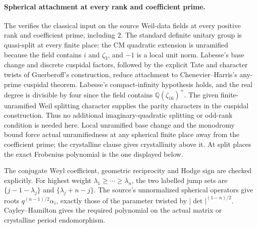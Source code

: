 \paragraph{Spherical attachment at every rank and coefficient prime.}
The  verifies the classical input on the source Weil-data fields
at every positive rank and coefficient prime, including \(2\). The standard
definite unitary group is quasi-split
at every finite place: the CM quadratic extension is unramified
because the field contains \(i\) and \(\zeta_3\), and \(-1\) is
a local unit norm. Labesse's base change and discrete cuspidal
factors, followed by the explicit Tate and character twists of
Guerberoff's construction, reduce attachment to Chenevier--Harris's
any-prime cuspidal theorem. Labesse's compact-infinity hypothesis
holds, and the real degree is divisible by four since the field contains
\(\mathbb Q(\zeta_{16})^+\). The given finite-unramified Weil splitting
character supplies the parity characters in the cuspidal construction.
Thus no additional imaginary-quadratic splitting or odd-rank
condition is needed here. Local unramified base change and the
monodromy bound force actual unramifiedness at any spherical finite
place away from the coefficient prime; the crystalline clause gives
crystallinity above it. At split places the exact Frobenius polynomial
is the one displayed below.

The conjugate Weyl coefficient, geometric reciprocity and Hodge
sign are checked explicitly. For highest weight
\(\lambda_1\ge\cdots\ge\lambda_n\), the two labelled jump sets are
\(\{j-1-\lambda_j\}\) and \(\{\lambda_j+n-j\}\).
The source's unnormalized spherical operators give roots
\(q^{(n-1)/2}\alpha_i\), exactly those of the parameter twisted by
\(\lvert\det\rvert^{(1-n)/2}\). Cayley--Hamilton gives the required
polynomial on the actual matrix or crystalline period endomorphism.

